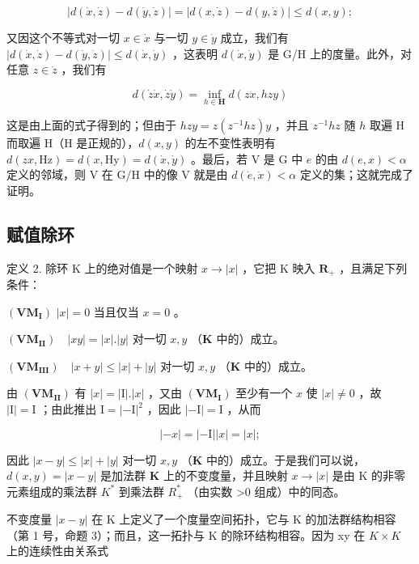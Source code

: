 \[
\left| d (\dot {x}, \dot {z}) - d (\dot {y}, \dot {z}) \right| = \left| d (x, \dot {z}) - d (y, \dot {z}) \right| \leqslant d (x, y);
\]

又因这个不等式对一切 \(x \in \dot{x}\) 与一切 \(y \in \dot{y}\) 成立，我们有 \(|d(\dot{x}, \dot{z}) - d(\dot{y}, \dot{z})| \leqslant d(\dot{x}, \dot{y})\) ，这表明 \(d(\dot{x}, \dot{y})\) 是 G/H 上的度量。此外，对任意 \(z \in \dot{z}\) ，我们有

\[
d (\dot {z} \dot {x}, \dot {z} \dot {y}) = \inf _ {h \in \mathbf {H}} d (z x, h z y)
\]

这是由上面的式子得到的；但由于 \(hzy = z(z^{-1}hz)y\) ，并且 \(z^{-1}hz\) 随 \(h\) 取遍 H 而取遍 H（H 是正规的），\(d(x,y)\) 的左不变性表明有 \(d(zx, \mathrm{Hz}) = d(x, \mathrm{Hy}) = d(\dot{x}, \dot{y})\) 。最后，若 V 是 G 中 \(e\) 的由 \(d(e, x) < \alpha\) 定义的邻域，则 V 在 G/H 中的像 V 就是由 \(d(\dot{e}, \dot{x}) < \alpha\) 定义的集；这就完成了证明。

\subsection{赋值除环}

定义 2. 除环 K 上的绝对值是一个映射 \(x \to |x|\) ，它把 K 映入 \(\mathbf{R}_{+}\) ，且满足下列条件：

\((\mathbf{VM}_{\mathbf{I}})\) \(|x| = 0\) 当且仅当 \(x = 0\) 。

\((\mathbf{VM}_{\mathbf{II}})\quad |xy| = |x|.|y|\) 对一切 \(x,y\) （\(\mathbf{K}\) 中的）成立。

\((\mathbf{VM}_{\mathbf{III}})\quad |x + y|\leqslant |x| + |y|\) 对一切 \(x,y\) （\(\mathbf{K}\) 中的）成立。

由 \((\mathbf{VM}_{\mathbf{II}})\) 有 \(|x| = |\mathrm{I}|.|x|\) ，又由 \((\mathbf{VM}_{\mathbf{I}})\) 至少有一个 \(x\) 使 \(|x| \neq 0\) ，故 \(|\mathrm{I}| = \mathrm{I}\) ；由此推出 \(\mathrm{I} = |- \mathrm{I}|^2\) ，因此 \(|- \mathrm{I}| = \mathrm{I}\) ，从而

\[
| - x | = | - \mathrm{I} | | x | = | x |;
\]

因此 \(|x - y| \leqslant |x| + |y|\) 对一切 \(x, y\) （\(\mathbf{K}\) 中的）成立。于是我们可以说，\(d(x, y) = |x - y|\) 是加法群 \(\mathbf{K}\) 上的不变度量，并且映射 \(x \to |x|\) 是由 K 的非零元素组成的乘法群 \(K^{*}\) 到乘法群 \(R_{+}^{*}\) （由实数 \textgreater0 组成）中的同态。

不变度量 \(|x - y|\) 在 K 上定义了一个度量空间拓扑，它与 K 的加法群结构相容（第 1 号，命题 3）；而且，这一拓扑与 K 的除环结构相容。因为 xy 在 \(K \times K\) 上的连续性由关系式

